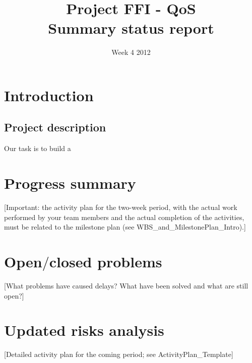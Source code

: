 \documentclass[titlepage]{article}
\title{Project FFI - QoS \\ Summary status report}
\date{Week 4 2012}
\begin{document}
    \maketitle
    \tableofcontents
    \newpage
      
\section{Introduction}
    \subsection{Project description}
        Our task is to build a 

\section{Progress summary}
    [Important: the activity plan for the two-week period, with the actual work performed by your team members and the actual completion of the activities, must be related to the milestone plan (see WBS_and_MilestonePlan_Intro).] 

\section{Open$/$closed problems}
    [What problems have caused delays? What have been solved and what are still open?]

\section{Updated risks analysis}
    [Detailed activity plan for the coming period; see ActivityPlan_Template]
\end{document}

